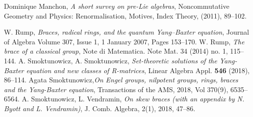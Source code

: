 \documentclass[12pt]{article}
\begin{document}
\begin{thebibliography}{99}
 Dominique Manchon,  {\em A short survey on pre-Lie algebras}, Noncommutative Geometry and Physics: Renormalisation, Motives, Index Theory, (2011), 89--102.

 W. Rump, {\em Braces, radical rings, and the quantum Yang–Baxter equation}, Journal of Algebra
Volume 307, Issue 1, 1 January 2007, Pages 153--170.
 W. Rump,  {\em The brace of a classical group}, Note di Matematica.
Note Mat. 34 (2014) no. 1, 115--144.
 A. Smoktunowicz, A. Smoktunowicz,  {\em Set-theoretic solutions of the Yang-Baxter equation and new classes of  R-matrices},  Linear Algebra Appl.  {\bf 546} (2018), 86--114. 
 Agata Smoktunowicz,{\em  On Engel groups, nilpotent groups, rings, braces and the Yang-Baxter equation}, Transactions of the AMS, 2018, Vol 370(9), 6535--6564.
 A. Smoktunowicz, L. Vendramin, {\em On skew braces (with an appendix by N. Byott and L. Vendramin)},  J. Comb. Algebra, 2(1), 2018, 47--86.
\end{thebibliography}
\end{document}
